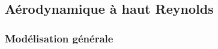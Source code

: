 %
%
%
%
%
%
%
%
%
%
%
%
%
%
%
%
%
%
%
%
%
%
%
%
%


\subsection{Aérodynamique à haut Reynolds}

\subsubsection{Modélisation générale}

